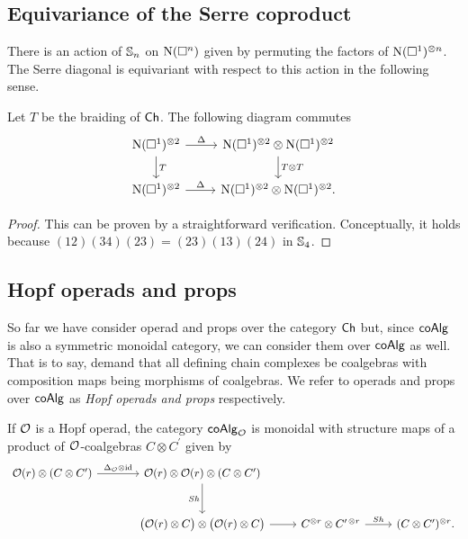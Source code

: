\subsection{Equivariance of the Serre coproduct}
There is an action of $\S_n$ on $\chains(\cube^n)$ given by permuting the factors of $\chains(\cube^1)^{\otimes n}$.
The Serre diagonal is equivariant with respect to this action in the following sense.

\begin{lemma} \label{l:serre diagonal invariant}
	Let $T$ be the braiding of $\Ch$.
	The following diagram commutes
	\begin{equation*}
	\begin{tikzcd}
	\chains(\cube^1)^{\otimes 2} \arrow[r, "\Delta"] \arrow[d, "T"] &
	\chains(\cube^1)^{\otimes 2} \otimes \chains(\cube^1)^{\otimes 2} \arrow[d, "T \otimes T"] \\
	\chains(\cube^1)^{\otimes 2} \arrow[r, "\Delta"] &
	\chains(\cube^1)^{\otimes 2} \otimes \chains(\cube^1)^{\otimes 2}.
	\end{tikzcd}
	\end{equation*}
\end{lemma}

\begin{proof}
	This can be proven by a straightforward verification. Conceptually, it holds because $(12)(34)(23) = (23)(13)(24)$ in $\S_4$.
\end{proof}

\subsection{Hopf operads and props}

So far we have consider operad and props over the category $\Ch$ but, since $\coAlg$ is also a symmetric monoidal category, we can consider them over $\coAlg$ as well.
That is to say, demand that all defining chain complexes be coalgebras with composition maps being morphisms of coalgebras.
We refer to operads and props over $\coAlg$ as \textit{Hopf operads and props} respectively.

If $\O$ is a Hopf operad, the category $\coAlg_\O$ is monoidal with structure maps of a product of $\O$-coalgebras $C \otimes C^\prime$ given by
\begin{equation*}
\begin{tikzcd} [column sep = normal, row sep=large]
\O(r) \otimes (C \otimes C^\prime) \arrow[r, "\Delta_\O \otimes \id"] &[10 pt] \O(r) \otimes \O(r) \otimes (C \otimes C^\prime) \arrow[d, "Sh"'] & & \\ &
\big(\O(r) \otimes C \big) \otimes \big( \O(r) \otimes C \big) \arrow[r] & 
C^{\otimes r} \otimes C^{\prime\, \otimes r} \arrow[r, "Sh"] &
(C \otimes C^\prime)^{\otimes r}.
\end{tikzcd}
\end{equation*}

